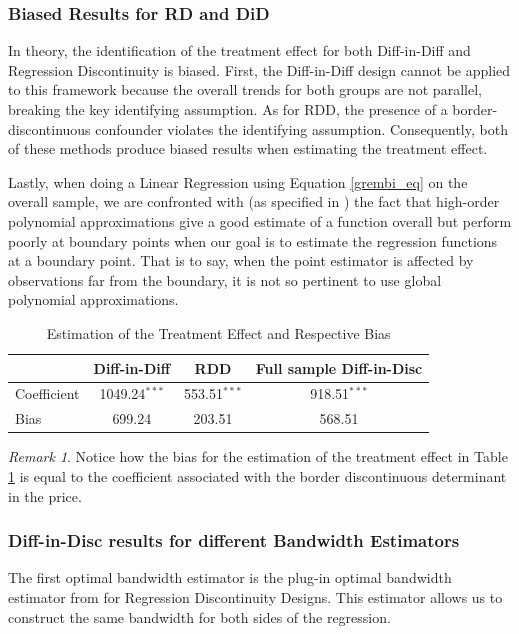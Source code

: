 \documentclass[12pt]{article}
\theoremstyle{plain}
\theoremstyle{remark}
\newtheorem*{remark}{Remark}
\begin{document}
\subsubsection{Biased Results for RD and DiD}

In theory, the identification of the treatment effect for both Diff-in-Diff and Regression Discontinuity is biased. First, the Diff-in-Diff design cannot be applied to this framework because the overall trends for both groups are not parallel, breaking the key identifying assumption. As for RDD, the presence of a border-discontinuous confounder violates the identifying assumption. Consequently, both of these methods produce biased results when estimating the treatment effect.

Lastly, when doing a Linear Regression using Equation \ref{grembi_eq} on the overall sample, we are confronted with (as specified in \cite{Cattaneo2020}) the fact that high-order polynomial approximations give a good estimate of a function overall but perform poorly at boundary points when our goal is to estimate the regression functions at a boundary point. That is to say, when the point estimator is affected by observations far from the boundary, it is not so pertinent to use global polynomial approximations. 


\begin{table}[h]
    \centering
    \begin{tabular}{lccc}
        \toprule
        & Diff-in-Diff & RDD & Full sample Diff-in-Disc \\
        \midrule
        Coefficient & 1049.24$^{***}$ & 553.51$^{***}$ & 918.51$^{***}$ \\
        Bias       & 699.24 & 203.51 & 568.51 \\
        \bottomrule
    \end{tabular}
    \caption{Estimation of the Treatment Effect and Respective Bias}
    \label{tab:results}
\end{table}

\begin{remark}
    Notice how the bias for the estimation of the treatment effect in Table \ref{tab:results} is equal to the coefficient associated with the border discontinuous determinant in the price.
\end{remark}

\subsubsection{Diff-in-Disc results for different Bandwidth Estimators}
The first optimal bandwidth estimator is the plug-in optimal bandwidth estimator from \textcite{Imbens2012} for Regression Discontinuity Designs. This estimator allows us to construct the same bandwidth for both sides of the regression.
\end{document}
